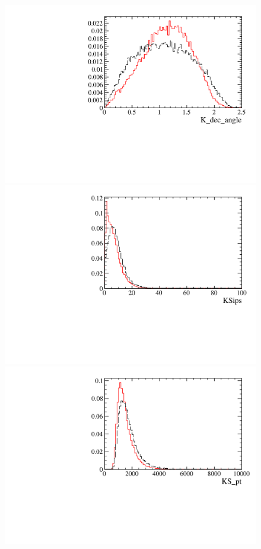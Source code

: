 \begin{figure} [htb!]
\begin{center}
\includegraphics[scale=0.20]{figs/K_dec_angleFULL.pdf}
\includegraphics[scale=0.20]{figs/KSipsFULL.pdf}
\includegraphics[scale=0.20]{figs/KS_ptFULL.pdf}

\end{center}
\end{figure}

